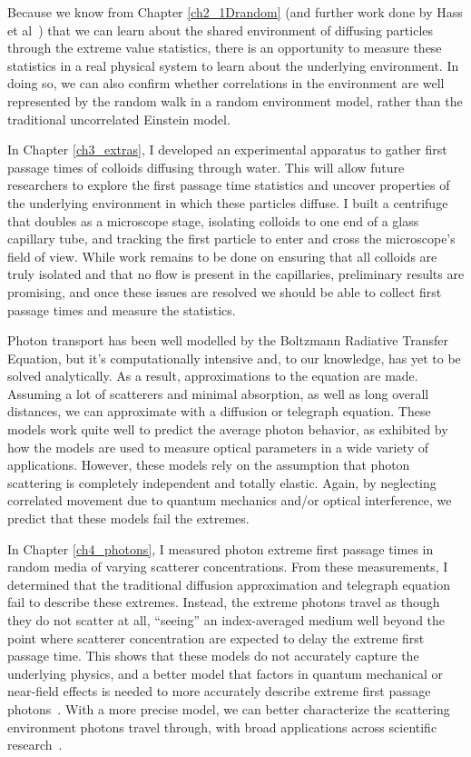 Because we know from Chapter \ref{ch2_1Drandom} (and further work done by Hass et al~\cite{hass_first-passage_2024}) that we can learn about the shared environment of diffusing particles through the extreme value statistics, there is an opportunity to measure these statistics in a real physical system to learn about the underlying environment. In doing so, we can also confirm whether correlations in the environment are well represented by the random walk in a random environment model, rather than the traditional uncorrelated Einstein model.

In Chapter \ref{ch3_extras}, I developed an experimental apparatus to gather first passage times of colloids diffusing through water. This will allow future researchers to explore the first passage time statistics and uncover properties of the underlying environment in which these particles diffuse. I built a centrifuge that doubles as a microscope stage, isolating colloids to one end of a glass capillary tube, and tracking the first particle to enter and cross the microscope's field of view. While work remains to be done on ensuring that all colloids are truly isolated and that no flow is present in the capillaries, preliminary results are promising, and once these issues are resolved we should be able to collect first passage times and measure the statistics.

Photon transport has been well modelled by the Boltzmann Radiative Transfer Equation, but it's computationally intensive and, to our knowledge, has yet to be solved analytically. As a result, approximations to the equation are made. Assuming a lot of scatterers and minimal absorption, as well as long overall distances, we can approximate with a diffusion or telegraph equation. These models work quite well to predict the average photon behavior, as exhibited by how the models are used to measure optical parameters in a wide variety of applications. However, these models rely on the assumption that photon scattering is completely independent and totally elastic. Again, by neglecting correlated movement due to quantum mechanics and/or optical interference, we predict that these models fail the extremes.

In Chapter \ref{ch4_photons}, I measured photon extreme first passage times in random media of varying scatterer concentrations. From these measurements, I determined that the traditional diffusion approximation and telegraph equation fail to describe these extremes. Instead, the extreme photons travel as though they do not scatter at all, ``seeing'' an index-averaged medium well beyond the point where scatterer concentration are expected to delay the extreme first passage time. This shows that these models do not accurately capture the underlying physics, and a better model that factors in quantum mechanical or near-field effects is needed to more accurately describe extreme first passage photons~\cite{pattelli_role_2018,pini_non-self-similar_2024}. With a more precise model, we can better characterize the scattering environment photons travel through, with broad applications across scientific research~\cite{allgaier_diffuse_2021,amendola_accuracy_2021,taitelbaum_diagnosis_1999,bohren_absorption_1983}. 

